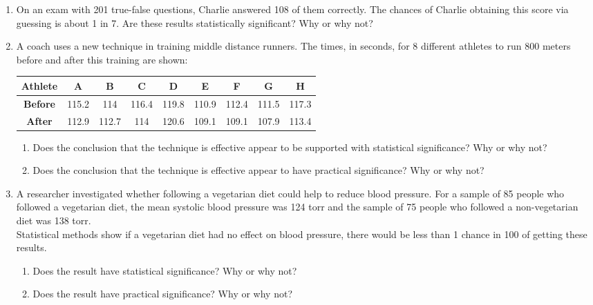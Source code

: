 \documentclass{article}
\newcounter{pset}
\begin{document}
\begin{enumerate} \setcounter{enumi}{\value{pset}}
    \item On an exam with 201 true-false questions, Charlie answered 108 of them correctly. The chances of Charlie obtaining this score via guessing is about 1 in 7. Are these results statistically significant? Why or why not?
    \item A coach uses a new technique in training middle distance runners. The times, in seconds, for 8 different athletes to run 800 meters before and after this training are shown:
    \begin{center}
        \begin{tabular}{c|c|c|c|c|c|c|c|c}
            \textbf{Athlete} & A & B & C & D & E & F & G & H \\ \hline 
            \textbf{Before} & 115.2 & 114 & 116.4 & 119.8 & 110.9 & 112.4 & 111.5 & 117.3 \\ \hline 
            \textbf{After} & 112.9 & 112.7 & 114 & 120.6 & 109.1 & 109.1 & 107.9 & 113.4
        \end{tabular}
    \end{center}
    \begin{enumerate}
        \item Does the conclusion that the technique is effective appear to be supported with statistical significance? Why or why not?
        \item Does the conclusion that the technique is effective appear to have practical significance? Why or why not?
    \end{enumerate}
    \item A researcher investigated whether following a vegetarian diet could help to reduce blood pressure. For a sample of 85 people who followed a vegetarian diet, the mean systolic blood pressure was 124 torr and the sample of 75 people who followed a non-vegetarian diet was 138 torr. \newline\\
    
    Statistical methods show if a vegetarian diet had no effect on blood pressure, there would be less than 1 chance in 100 of getting these results.
    \begin{enumerate}
        \item Does the result have statistical significance? Why or why not?
        \item Does the result have practical significance? Why or why not?
    \end{enumerate}
\end{enumerate}     \setcounter{pset}{\value{enumi}}
\end{document}
